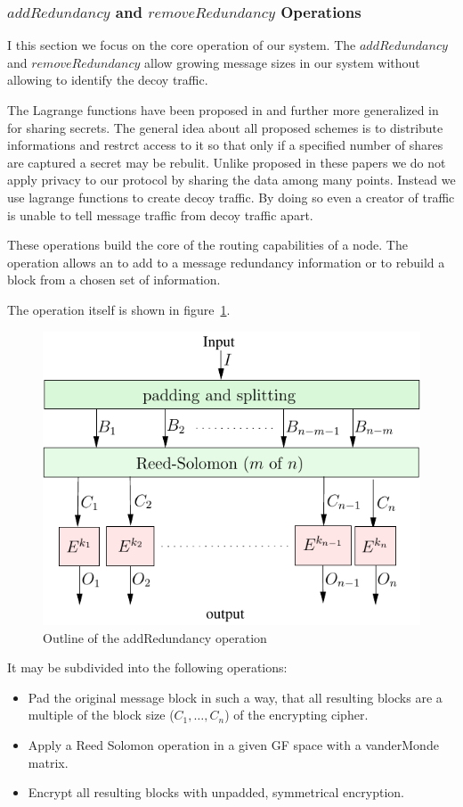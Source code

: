 \subsubsection{$addRedundancy$ and $removeRedundancy$ Operations}
I this section we focus on the core operation of our system. The $addRedundancy$ and $removeRedundancy$ allow growing message sizes in our system without allowing to identify the decoy traffic. 

The Lagrange functions have been proposed in \cite{shamir1979share} and further more generalized in \cite{mceliece1981sharing} for sharing secrets. The general idea about all proposed schemes is to distribute informations and restrct access to it so that only if a specified number of shares are captured a secret may be rebulit. Unlike proposed in these papers we do not apply privacy to our protocol by sharing the data among many points. Instead we use lagrange functions to create decoy traffic. By doing so even a creator of traffic is unable to tell message traffic from decoy traffic apart. 

These operations build the core of the routing capabilities of a node. The operation allows an  to add to a message redundancy information or to rebuild a block from a chosen set of information. 

The operation itself is shown in figure~\ref{fig:addRedundancyOperation}. 
\begin{figure}[ht]\centering
	\includegraphics[width=0.8\columnwidth]{inc/addRedundancyOp}
	\caption{Outline of the addRedundancy operation}
	\label{fig:addRedundancyOperation}
\end{figure}

It may be subdivided into the following operations:
\begin{itemize}
	\item Pad the original message block in such a way, that all resulting blocks are a multiple of the block size ($C_1,\ldots, C_n$) of the encrypting cipher.
	\item Apply a Reed Solomon operation in a given GF space with a vanderMonde matrix.
	\item Encrypt all resulting blocks with unpadded, symmetrical encryption.
\end{itemize}

